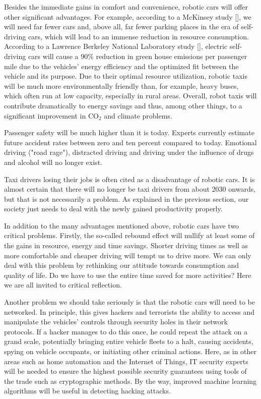 \documentclass[10pt]{article}
\begin{document}
Besides the immediate gains in comfort and convenience, robotic cars will offer other significant advantages. For example, according to a McKinsey study [\cite{gao2014roadmap}], we will need far fewer cars and, above all, far fewer parking places in the era of self-driving cars, which will lead to an immense reduction in resource consumption. According to a Lawrence Berkeley National Laboratory study [\cite{greenblatt2015autonomous}], electric self-driving cars will cause a $90 \%$ reduction in green house emissions per passenger mile due to the vehicles' energy efficiency and the optimized fit between the vehicle and its purpose. Due to their optimal resource utilization, robotic taxis will be much more environmentally friendly than, for example, heavy buses, which often run at low capacity, especially in rural areas. Overall, robot taxis will contribute dramatically to energy savings and thus, among other things, to a significant improvement in $\mathrm{CO}_{2}$ and climate problems.

Passenger safety will be much higher than it is today. Experts currently estimate future accident rates between zero and ten percent compared to today. Emotional driving ("road rage"), distracted driving and driving under the influence of drugs and alcohol will no longer exist.

Taxi drivers losing their jobs is often cited as a disadvantage of robotic cars. It is almost certain that there will no longer be taxi drivers from about 2030 onwards, but that is not necessarily a problem. As explained in the previous section, our society just needs to deal with the newly gained productivity properly.

In addition to the many advantages mentioned above, robotic cars have two critical problems. Firstly, the so-called rebound effect will nullify at least some of the gains in resource, energy and time savings. Shorter driving times as well as more comfortable and cheaper driving will tempt us to drive more. We can only deal with this problem by rethinking our attitude towards consumption and quality of life. Do we have to use the entire time saved for more activities? Here we are all invited to critical reflection.

Another problem we should take seriously is that the robotic cars will need to be networked. In principle, this gives hackers and terrorists the ability to access and manipulate the vehicles' controls through security holes in their network protocols. If a hacker manages to do this once, he could repeat the attack on a grand scale, potentially bringing entire vehicle fleets to a halt, causing accidents, spying on vehicle occupants, or initiating other criminal actions. Here, as in other areas such as home automation and the Internet of Things, IT security experts will be needed to ensure the highest possible security guarantees using tools of the trade such as cryptographic methods. By the way, improved machine learning algorithms will be useful in detecting hacking attacks.
\end{document}
